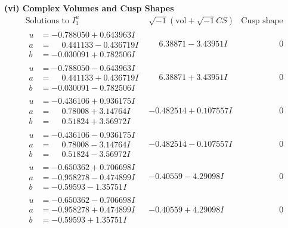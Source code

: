 \documentclass[1p]{elsarticle_modified}
\theoremstyle{definition}
\newcommand{\I}{\sqrt{-1}}
\begin{document}
\newpage\flushleft \textbf{(vi) Complex Volumes and Cusp Shapes}
$$\begin{array}{c|c|c}  
\text{Solutions to }I^u_{1}& \I (\text{vol} + \sqrt{-1}CS) & \text{Cusp shape}\\
 \hline 
\begin{aligned}
u &= -0.788050 + 0.643963 I \\
a &= \phantom{-}0.441133 - 0.436719 I \\
b &= -0.030091 + 0.782506 I\end{aligned}
 & \phantom{-}6.38871 - 3.43951 I & \phantom{-0.000000 } 0 \\ \hline\begin{aligned}
u &= -0.788050 - 0.643963 I \\
a &= \phantom{-}0.441133 + 0.436719 I \\
b &= -0.030091 - 0.782506 I\end{aligned}
 & \phantom{-}6.38871 + 3.43951 I & \phantom{-0.000000 } 0 \\ \hline\begin{aligned}
u &= -0.436106 + 0.936175 I \\
a &= \phantom{-}0.78008 + 3.14764 I \\
b &= \phantom{-}0.51824 + 3.56972 I\end{aligned}
 & -0.482514 + 0.107557 I & \phantom{-0.000000 } 0 \\ \hline\begin{aligned}
u &= -0.436106 - 0.936175 I \\
a &= \phantom{-}0.78008 - 3.14764 I \\
b &= \phantom{-}0.51824 - 3.56972 I\end{aligned}
 & -0.482514 - 0.107557 I & \phantom{-0.000000 } 0 \\ \hline\begin{aligned}
u &= -0.650362 + 0.706698 I \\
a &= -0.958278 - 0.474899 I \\
b &= -0.59593 - 1.35751 I\end{aligned}
 & -0.40559 - 4.29098 I & \phantom{-0.000000 } 0 \\ \hline\begin{aligned}
u &= -0.650362 - 0.706698 I \\
a &= -0.958278 + 0.474899 I \\
b &= -0.59593 + 1.35751 I\end{aligned}
 & -0.40559 + 4.29098 I & \phantom{-0.000000 } 0 \\ \hline\begin{aligned}

\end{aligned}
\end{array}$$
\end{document}
